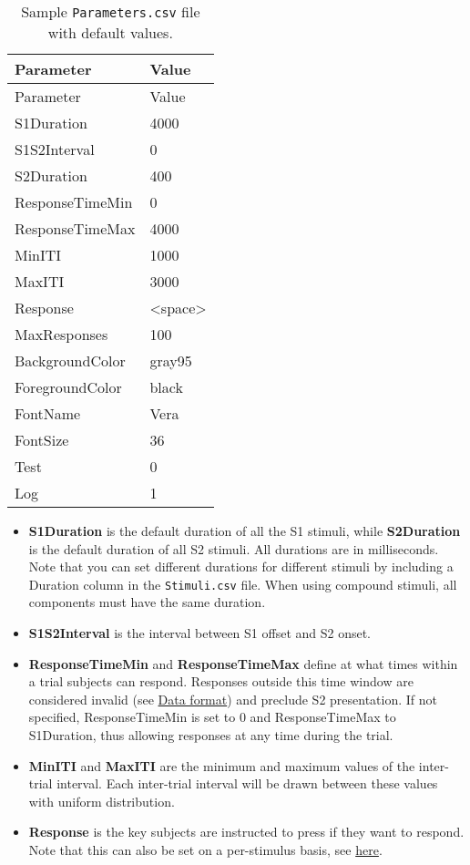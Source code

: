 \documentclass[11pt,]{article}
\begin{document}
\begin{longtable}[c]{@{}ll@{}}
\caption{Sample \texttt{Parameters.csv} file with default
values.}\tabularnewline
\toprule
Parameter & Value\tabularnewline
\midrule
\endfirsthead
\toprule
Parameter & Value\tabularnewline
\midrule
\endhead
S1Duration & 4000\tabularnewline
S1S2Interval & 0\tabularnewline
S2Duration & 400\tabularnewline
ResponseTimeMin & 0\tabularnewline
ResponseTimeMax & 4000\tabularnewline
MinITI & 1000\tabularnewline
MaxITI & 3000\tabularnewline
Response & \textless{}space\textgreater{}\tabularnewline
MaxResponses & 100\tabularnewline
BackgroundColor & gray95\tabularnewline
ForegroundColor & black\tabularnewline
FontName & Vera\tabularnewline
FontSize & 36\tabularnewline
Test & 0\tabularnewline
Log & 1\tabularnewline
\bottomrule
\end{longtable}

\begin{itemize}
\item
  \textbf{S1Duration} is the default duration of all the S1 stimuli,
  while \textbf{S2Duration} is the default duration of all S2 stimuli.
  All durations are in milliseconds. Note that you can set different
  durations for different stimuli by including a Duration column in the
  \texttt{Stimuli.csv} file. When using compound stimuli, all components
  must have the same duration.
\item
  \textbf{S1S2Interval} is the interval between S1 offset and S2 onset.
\item
  \textbf{ResponseTimeMin} and \textbf{ResponseTimeMax} define at what
  times within a trial subjects can respond. Responses outside this time
  window are considered invalid (see \hyperref[data-format]{Data
  format}) and preclude S2 presentation. If not specified,
  ResponseTimeMin is set to 0 and ResponseTimeMax to S1Duration, thus
  allowing responses at any time during the trial.
\item
  \textbf{MinITI} and \textbf{MaxITI} are the minimum and maximum values
  of the inter-trial interval. Each inter-trial interval will be drawn
  between these values with uniform distribution.
\item
  \textbf{Response} is the key subjects are instructed to press if they
  want to respond. Note that this can also be set on a per-stimulus
  basis, see \hyperref[responses]{here}.
\end{itemize}
\end{document}
